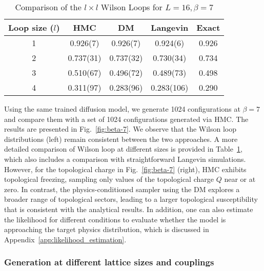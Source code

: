 \documentclass[a4paper,11pt]{article}
\begin{document}
\begin{table}[htbp!] 
    \centering 
    \caption{Comparison of the $l \times l$ Wilson Loops for $L=16, \beta=7$} 
    \label{tab:L16_beta7} 
    \renewcommand{\arraystretch}{1.2}
    \setlength{\tabcolsep}{12pt}
    \begin{tabular}{|c|cccc|}
        \hline
        Loop size ($l$) & \multicolumn{1}{c}{HMC} & \multicolumn{1}{c}{DM} & \multicolumn{1}{c}{Langevin} & \multicolumn{1}{c|}{Exact} \\ 
        \hline
        1 & 0.926(7)  & 0.926(7)  & 0.924(6)  & 0.926  \\ 
        2 & 0.737(31) & 0.737(32) & 0.730(34) & 0.734  \\ 
        3 & 0.510(67) & 0.496(72) & 0.489(73) & 0.498  \\ 
        4 & 0.311(97) & 0.283(96) & 0.283(106) & 0.290  \\
        \hline
    \end{tabular}
\end{table}

Using the same trained diffusion model, we generate 1024 configurations at $\beta=7$ and compare them with a set of 1024 configurations generated via HMC. The results are presented in Fig.~\ref{fig:beta-7}. We observe that the Wilson loop distributions (left) remain consistent between the two approaches. A more detailed comparison of Wilson loop at different sizes is provided in Table~\ref{tab:L16_beta7}, which also includes a comparison with straightforward Langevin simulations. However, for the topological charge in Fig.~\ref{fig:beta-7} (right), HMC exhibits topological freezing, sampling only values of the topological charge $Q$ near or at zero. In contrast, the physics-conditioned sampler using the DM explores a broader range of topological sectors, leading to a larger topological susceptibility that is consistent with the analytical results. In addition, one can also estimate the likelihood for different conditions to evaluate whether the model is approaching the target physics distribution, which is discussed in Appendix~\ref{app:likelihood_estimation}.

\subsubsection{Generation at different lattice sizes and couplings}
\end{document}
